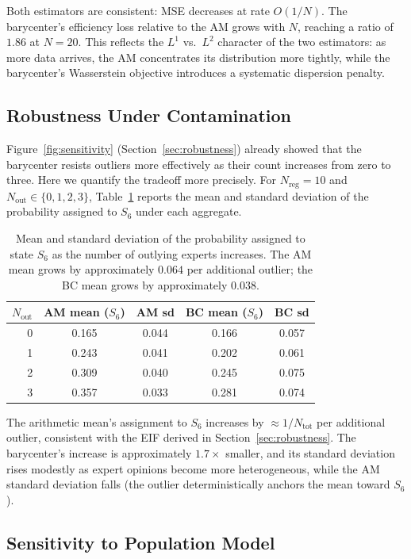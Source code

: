 Both estimators are consistent: MSE decreases at rate $O(1/N)$.  The barycenter's efficiency loss relative to the AM grows with $N$, reaching a ratio of $1.86$ at $N=20$.  This reflects the $L^1$ vs.\ $L^2$ character of the two estimators: as more data arrives, the AM concentrates its distribution more tightly, while the barycenter's Wasserstein objective introduces a systematic dispersion penalty.

\subsection{Robustness Under Contamination}

Figure~\ref{fig:sensitivity} (Section~\ref{sec:robustness}) already showed that the barycenter resists outliers more effectively as their count increases from zero to three.  Here we quantify the tradeoff more precisely.  For $N_{\mathrm{reg}} = 10$ and $N_{\mathrm{out}} \in \{0,1,2,3\}$, Table~\ref{tab:robustness} reports the mean and standard deviation of the probability assigned to $S_6$ under each aggregate.

\begin{table}[ht]
\centering
\begin{tabular}{rcccc}
\hline
$N_{\mathrm{out}}$ & AM mean ($S_6$) & AM sd & BC mean ($S_6$) & BC sd \\
\hline
0 & 0.165 & 0.044 & 0.166 & 0.057 \\
1 & 0.243 & 0.041 & 0.202 & 0.061 \\
2 & 0.309 & 0.040 & 0.245 & 0.075 \\
3 & 0.357 & 0.033 & 0.281 & 0.074 \\
\hline
\end{tabular}
\caption{Mean and standard deviation of the probability assigned to state $S_6$ as the number of outlying experts increases.  The AM mean grows by approximately $0.064$ per additional outlier; the BC mean grows by approximately $0.038$.}
\label{tab:robustness}
\end{table}

The arithmetic mean's assignment to $S_6$ increases by $\approx 1/N_{\mathrm{tot}}$ per additional outlier, consistent with the EIF derived in Section~\ref{sec:robustness}.  The barycenter's increase is approximately $1.7\times$ smaller, and its standard deviation rises modestly as expert opinions become more heterogeneous, while the AM standard deviation falls (the outlier deterministically anchors the mean toward $S_6$).

\subsection{Sensitivity to Population Model}

